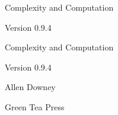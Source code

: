 \documentclass[10pt]{book}
\newcommand{\thetitle}{Complexity and Computation}
\newcommand{\theversion}{0.9.4}
\begin{document}
\frontmatter




\newtheorem{ex}{Exercise}[chapter]

\begin{latexonly}

\renewcommand{\blankpage}{\thispagestyle{empty} \quad \newpage}



\thispagestyle{empty}

\begin{flushright}
\vspace*{2.0in}

\begin{spacing}{3}
{\huge \thetitle}
\end{spacing}

\vspace{0.25in}

Version \theversion

\vfill

\end{flushright}


\blankpage
\blankpage

\pagebreak
\thispagestyle{empty}

\begin{flushright}
\vspace*{2.0in}

\begin{spacing}{3}
{\huge \thetitle}
\end{spacing}

\vspace{0.25in}

Version \theversion

\vspace{1in}


{\Large
Allen Downey\\
}


\vspace{0.5in}

{\Large Green Tea Press}


\end{flushright}
\end{latexonly}
\end{document}
